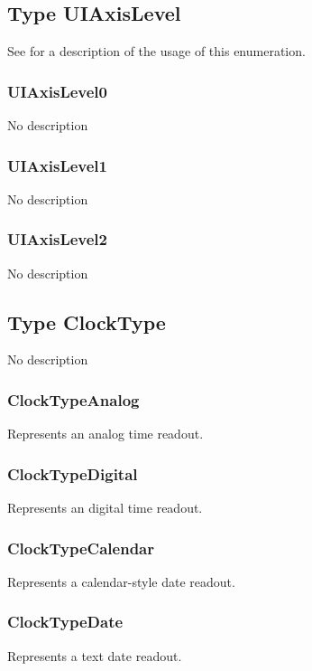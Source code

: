 \subsection{Type UIAxisLevel \label{T:UIAxisLevel}}
See  for a description of the usage of this enumeration.



\subsubsection{UIAxisLevel0 \label{T:UIAxisLevel|UIAxisLevel0}}
No description

\subsubsection{UIAxisLevel1 \label{T:UIAxisLevel|UIAxisLevel1}}
No description

\subsubsection{UIAxisLevel2 \label{T:UIAxisLevel|UIAxisLevel2}}
No description

\subsection{Type ClockType \label{T:ClockType}}
No description

\subsubsection{ClockTypeAnalog \label{T:ClockType|ClockTypeAnalog}}
Represents an analog time readout.

\subsubsection{ClockTypeDigital \label{T:ClockType|ClockTypeDigital}}
Represents an digital time readout.

\subsubsection{ClockTypeCalendar \label{T:ClockType|ClockTypeCalendar}}
Represents a calendar-style date readout.

\subsubsection{ClockTypeDate \label{T:ClockType|ClockTypeDate}}
Represents a text date readout.

